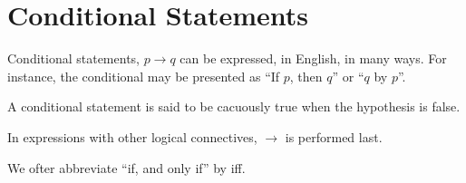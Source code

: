 \guard

\section{Conditional Statements}



Conditional statements, $p\rightarrow q$ can be expressed, in English, in many ways.
For instance, the conditional may be presented as ``If $p$, then $q$'' or ``$q$ by $p$''.

A conditional statement is said to be cacuously true when the hypothesis is false.

In expressions with other logical connectives, $\rightarrow$ is performed last.





















We ofter abbreviate ``if, and only if'' by iff.





% 
